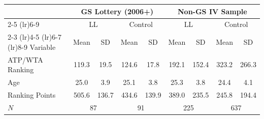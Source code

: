 \begin{tabular}{l cccc cccc}
\toprule
 & \multicolumn{4}{c}{GS Lottery (2006+)} & \multicolumn{4}{c}{Non-GS IV Sample} \\
\cmidrule(lr){2-5} \cmidrule(lr){6-9}
 & \multicolumn{2}{c}{LL} & \multicolumn{2}{c}{Control} & \multicolumn{2}{c}{LL} & \multicolumn{2}{c}{Control} \\
\cmidrule(lr){2-3} \cmidrule(lr){4-5} \cmidrule(lr){6-7} \cmidrule(lr){8-9}
Variable & Mean & SD & Mean & SD & Mean & SD & Mean & SD \\
\midrule
ATP/WTA Ranking & 119.3 & 19.5 & 124.6 & 17.8 & 192.1 & 152.4 & 323.2 & 266.3 \\
Age & 25.0 & 3.9 & 25.1 & 3.8 & 25.3 & 3.8 & 24.4 & 4.1 \\
Ranking Points & 505.6 & 136.7 & 434.6 & 139.9 & 389.0 & 235.5 & 245.8 & 194.4 \\
\midrule
$N$ & \multicolumn{2}{c}{87} & \multicolumn{2}{c}{91} & \multicolumn{2}{c}{225} & \multicolumn{2}{c}{637} \\
\bottomrule
\end{tabular}
